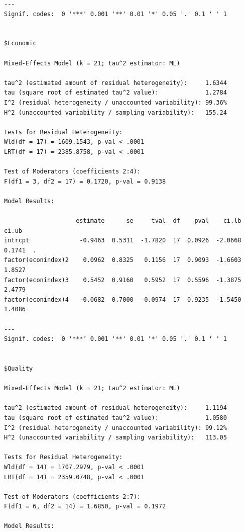 \documentclass[
  letterpaper,
  DIV=11,
  numbers=noendperiod]{scrartcl}
\begin{document}
\begin{verbatim}
---
Signif. codes:  0 '***' 0.001 '**' 0.01 '*' 0.05 '.' 0.1 ' ' 1


$Economic

Mixed-Effects Model (k = 21; tau^2 estimator: ML)

tau^2 (estimated amount of residual heterogeneity):     1.6344
tau (square root of estimated tau^2 value):             1.2784
I^2 (residual heterogeneity / unaccounted variability): 99.36%
H^2 (unaccounted variability / sampling variability):   155.24

Tests for Residual Heterogeneity:
Wld(df = 17) = 1609.1543, p-val < .0001
LRT(df = 17) = 2385.8758, p-val < .0001

Test of Moderators (coefficients 2:4):
F(df1 = 3, df2 = 17) = 0.1720, p-val = 0.9138

Model Results:

                    estimate      se     tval  df    pval    ci.lb   ci.ub    
intrcpt              -0.9463  0.5311  -1.7820  17  0.0926  -2.0668  0.1741  . 
factor(econindex)2    0.0962  0.8325   0.1156  17  0.9093  -1.6603  1.8527    
factor(econindex)3    0.5452  0.9160   0.5952  17  0.5596  -1.3875  2.4779    
factor(econindex)4   -0.0682  0.7000  -0.0974  17  0.9235  -1.5450  1.4086    

---
Signif. codes:  0 '***' 0.001 '**' 0.01 '*' 0.05 '.' 0.1 ' ' 1


$Quality

Mixed-Effects Model (k = 21; tau^2 estimator: ML)

tau^2 (estimated amount of residual heterogeneity):     1.1194
tau (square root of estimated tau^2 value):             1.0580
I^2 (residual heterogeneity / unaccounted variability): 99.12%
H^2 (unaccounted variability / sampling variability):   113.05

Tests for Residual Heterogeneity:
Wld(df = 14) = 1707.2979, p-val < .0001
LRT(df = 14) = 2359.0748, p-val < .0001

Test of Moderators (coefficients 2:7):
F(df1 = 6, df2 = 14) = 1.6850, p-val = 0.1972

Model Results:


\end{verbatim}
\end{document}
